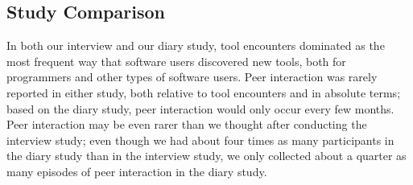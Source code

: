 \documentclass[smallextended]{svjour3}
\newcommand\discovery{peer interaction\xspace}
\newcommand\Discovery{Peer interaction\xspace}
\newcommand\discpush{peer recommendation\xspace}
\newcommand\discpull{peer observation\xspace}
\begin{document}

% 
% 
% 	
% 
% 
% 

\subsection{Study Comparison}\label{sec:studyComparison}

In both our interview and our diary study, tool encounters dominated
as the most frequent way that software users discovered new tools,
both for programmers and other types of software users.
\Discovery was rarely reported in either study, both relative to 
tool encounters and in absolute terms; based on the diary study, \discovery
would only occur every few months.
\Discovery may be even rarer than we thought after conducting the interview study; 
even though 
we had about four times as many participants in
the diary study than in the interview study, we only collected about
a quarter as many episodes of \discovery in the diary study.
\end{document}
